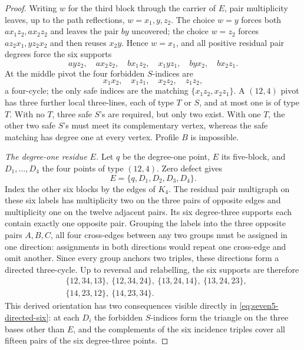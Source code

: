 \begin{proof}
Writing \(w\) for the third block through the carrier of \(E\), pair
multiplicity leaves, up to the path reflections, \(w=x_1,y,z_2\).
The choice \(w=y\) forces both \(ax_1z_2,ax_2z_2\) and leaves the pair
\(by\) uncovered; the choice \(w=z_2\) forces
\(az_2x_1,yz_2x_2\) and then reuses \(x_2y\).  Hence \(w=x_1\), and all
positive residual pair degrees force the six supports
\begin{equation}\label{eq:seven5-path-six}
 ayz_2,\quad ax_2z_2,\quad bx_1z_2,\quad
 x_1yz_1,\quad byx_2,\quad bx_2z_1.
\end{equation}
At the middle pivot the four forbidden \(S\)-indices are
\[
 x_1x_2,\quad x_1z_1,\quad x_2z_2,\quad z_1z_2,
\]
a four-cycle; the only safe indices are the matching
\(\{x_1z_2,x_2z_1\}\).  A \((12,4)\) pivot has three further local
three-lines, each of type \(T\) or \(S\), and at most one is of type \(T\).
With no \(T\), three safe \(S\)'s are required, but only two exist.  With
one \(T\), the other two safe \(S\)'s must meet its complementary vertex,
whereas the safe matching has degree one at every vertex.  Profile \(B\)
is impossible.

\smallskip
\noindent\emph{The degree-one residue \(E\).}
Let \(q\) be the degree-one point, \(E\) its five-block, and
\(D_1,\ldots,D_4\) the four points of type \((12,4)\).  Zero defect gives
\[
 E=\{q,D_1,D_2,D_3,D_4\}.
\]
Index the other six blocks by the edges of \(K_4\).  The residual pair
multigraph on these six labels has multiplicity two on the three pairs of
opposite edges and multiplicity one on the twelve adjacent pairs.  Its six
degree-three supports each contain exactly one opposite pair.  Grouping
the labels into the three opposite pairs \(A,B,C\), all four cross-edges
between any two groups must be assigned in one direction: assignments in
both directions would repeat one cross-edge and omit another.  Since every
group anchors two triples, these directions form a directed three-cycle.
Up to reversal and relabelling, the six supports are therefore
\begin{equation}\label{eq:seven5-directed-six}
\begin{split}
&\{12,34,13\},\ \{12,34,24\},\
  \{13,24,14\},\ \{13,24,23\},\\
&\{14,23,12\},\ \{14,23,34\}.
\end{split}
\end{equation}
This derived orientation has two consequences visible directly in
\eqref{eq:seven5-directed-six}: at each \(D_i\) the forbidden \(S\)-indices
form the triangle on the three bases other than \(E\), and the complements
of the six incidence triples cover all fifteen pairs of the six
degree-three points.


\end{proof}
